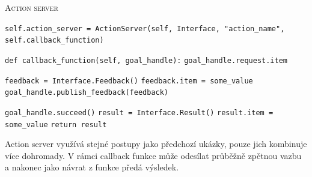 \begin{algorithm}[h!]
	\label{}
	\caption{\textsc{Action server}}
	
	\DontPrintSemicolon
	\SetAlgoNoLine
	\SetNlSty{}{}{:}
	\SetNlSkip{-1.1em}
	
	\BlankLine \Indp\Indpp
	
	\texttt{self.action\_server = ActionServer(self, Interface, "action\_name", self.callback\_function)}\;
	
	\BlankLine
	\texttt{def callback\_function(self, goal\_handle):}\;
	\Indp\Indp
	\texttt{goal\_handle.request.item}\;
	
	\BlankLine
	\texttt{feedback = Interface.Feedback()}\;
	\texttt{feedback.item = some\_value}\;
	\texttt{goal\_handle.publish\_feedback(feedback)}\;
	
	\BlankLine
	\texttt{goal\_handle.succeed()}\;
	\texttt{result = Interface.Result()}\;
	\texttt{result.item = some\_value}\;
	\texttt{return result}\;
\end{algorithm}
Action server využívá stejné postupy jako předchozí ukázky, pouze jich kombinuje více dohromady. V rámci callback funkce může odesílat průběžně zpětnou vazbu a nakonec jako návrat z funkce předá výsledek.

